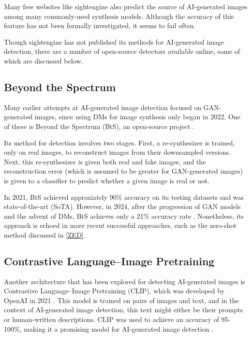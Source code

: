 \documentclass{article} %
\begin{document}
Many free websites like sightengine also predict the source of AI-generated images among many commonly-used synthesis models. Although the accuracy of this feature has not been formally investigated, it seems to fail often.

Though sightengine has not published its methods for AI-generated image detection, there are a number of open-source detectors available online, some of which are discussed below.

\subsection{Beyond the Spectrum}

Many earlier attempts at AI-generated image detection focused on GAN-generated images, since using DMs for image synthesis only began in 2022. One of these is Beyond the Spectrum (BtS), an open-source project \citep{he2021spectrumdetectingdeepfakesresynthesis}.

Its method for detection involves two stages. First, a re-synthesizer is trained, only on real images, to reconstruct images from their downsampled versions. Next, this re-synthesizer is given both real and fake images, and the reconstruction error (which is assumed to be greater for GAN-generated images) is given to a classifier to predict whether a given image is real or not.

In 2021, BtS achieved approxiately 90\% accuracy on its testing datasets and was state-of-the-art (SoTA). However, in 2024, after the progression of GAN models and the advent of DMs, BtS achieves only a 21\% accuracy rate \citep{li2024adversarialaiartunderstandinggeneration}. Nonetheless, its approach is echoed in more recent successful approaches, such as the zero-shot method discussed in \ref{ZED}.

\subsection{Contrastive Language–Image Pretraining}

Another architecture that has been explored for detecting AI-generated images is Contrastive Language–Image Pretraining (CLIP), which was developed by OpenAI in 2021 \citep{radford2021learningtransferablevisualmodels}. This model is trained on pairs of images and text, and in the context of AI-generated image detection, this text might either be their prompts or human-written descriptions. CLIP was used to achieve an accuracy of 95-100\%, making it a promising model for AI-generated image detection \citep{moskowitz2024detectingaigeneratedimagesclip}.
\end{document}
